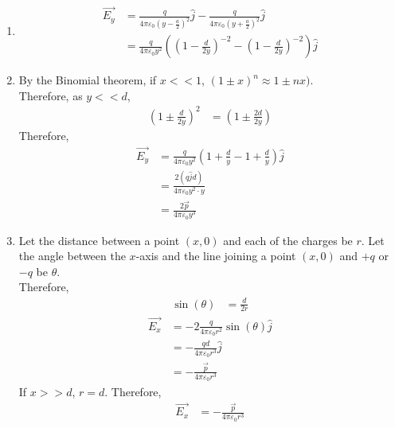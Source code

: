 \documentclass[fleqn, a4paper, 12pt, twoside]{article}
\theoremstyle{definition}
\theoremstyle{theorem}
\begin{document}
\begin{solution}
	\begin{enumerate}[leftmargin=*]
		\item 
			\begin{align*}
				\overrightarrow{E_y} & = \frac{q}{4 \pi \varepsilon_0 \left( y - \frac{a}{2} \right)^2} \hat{j} - \frac{q}{4 \pi \varepsilon_0 \left( y + \frac{a}{2} \right)^2} \hat{j} \\
                                                     & = \frac{q}{4 \pi \varepsilon_0 y^2} \left( \left( 1 - \frac{d}{2 y} \right)^{-2} - \left( 1 - \frac{d}{2 y} \right)^{-2} \right) \hat{j}
			\end{align*}
		\item
			By the Binomial theorem, if $x << 1$, $(1 \pm x)^n \approx 1 \pm n x)$.\\
			Therefore, as $y << d$,
			\begin{align*}
				\left( 1 \pm \frac{d}{2 y} \right)^2 & = \left( 1 \pm \frac{2 d}{2 y} \right)
			\end{align*}
			Therefore,
			\begin{align*}
				\overrightarrow{E_y} & = \frac{q}{4 \pi \varepsilon_0 y^2} \left( 1 + \frac{d}{y} - 1 + \frac{d}{y} \right) \hat{j} \\
                                                     & = \frac{2 \left( q \hat{j} d \right)}{4 \pi \varepsilon_0 y^2 \cdot y}                        \\
                                                     & = \frac{2 \overrightarrow{p}}{4 \pi \varepsilon_0 y^3}
			\end{align*}
		\item
			Let the distance between a point $(x,0)$ and each of the charges be $r$.
			Let the angle between the $x$-axis and the line joining a point $(x,0)$ and $+q$ or $-q$ be $\theta$.\\
			Therefore,
			\begin{align*}
				\sin(\theta) & = \frac{d}{2 r}
			\end{align*}
			\begin{align*}
				\overrightarrow{E_x} & = -2 \frac{q}{4 \pi \varepsilon_0 r^2} \sin(\theta) \hat{j} \\
                                                     & = -\frac{q d}{4 \pi \varepsilon_0 r^3} \hat{j}             \\
                                                     & = -\frac{\overrightarrow{p}}{4 \pi \varepsilon_0 r^3}
			\end{align*}
			If $x >> d$, $r = d$.
			Therefore,
			\begin{align*}
				\overrightarrow{E_x} & = -\frac{\overrightarrow{p}}{4 \pi \varepsilon_0 r^3}
			\end{align*}
	\end{enumerate}
\end{solution}
\end{document}
